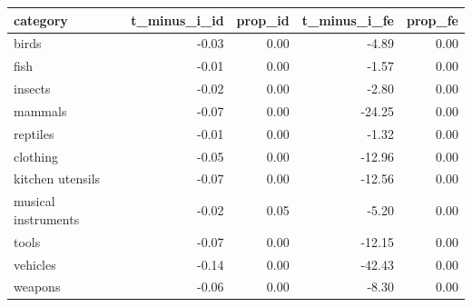 \begin{table}[ht]
\centering
\begin{tabular}{lrrrr}
  \hline
category & t\_minus\_i\_id & prop\_id & t\_minus\_i\_fe & prop\_fe \\ 
  \hline
birds & -0.03 & 0.00 & -4.89 & 0.00 \\ 
  fish & -0.01 & 0.00 & -1.57 & 0.00 \\ 
  insects & -0.02 & 0.00 & -2.80 & 0.00 \\ 
  mammals & -0.07 & 0.00 & -24.25 & 0.00 \\ 
  reptiles & -0.01 & 0.00 & -1.32 & 0.00 \\ 
  clothing & -0.05 & 0.00 & -12.96 & 0.00 \\ 
  kitchen utensils & -0.07 & 0.00 & -12.56 & 0.00 \\ 
  musical instruments & -0.02 & 0.05 & -5.20 & 0.00 \\ 
  tools & -0.07 & 0.00 & -12.15 & 0.00 \\ 
  vehicles & -0.14 & 0.00 & -42.43 & 0.00 \\ 
  weapons & -0.06 & 0.00 & -8.30 & 0.00 \\ 
   \hline
\end{tabular}
\end{table}
